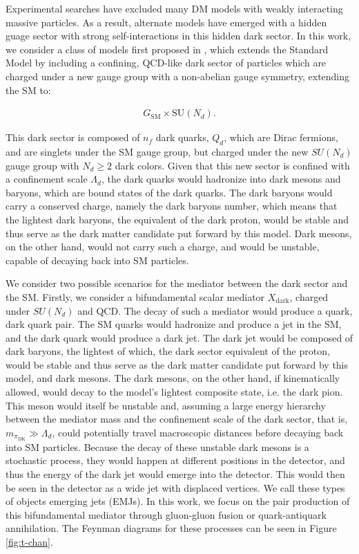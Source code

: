 Experimental searches have excluded many DM models with weakly interacting massive particles. As a result, alternate models have emerged with a hidden guage sector with strong self-interactions in this hidden dark sector. In this work, we consider a class of models first proposed in \cite{schwallerEmergingJets2015}, which extends the Standard Model by including a confining, QCD-like dark sector of particles which are charged under a new gauge group with a non-abelian gauge symmetry, extending the SM to:

\begin{equation}
	\begin{aligned}
		G_{\text{SM}} \times \text{SU}(N_d).
	\end{aligned}
\end{equation}

This dark sector is composed of $n_f$ dark quarks, $Q_d$, which are Dirac fermions, and are singlets under the SM gauge group, but charged under the new $SU(N_d)$ gauge group with $N_d \geq 2$ dark colors. Given that this new sector is confined with a confinement scale $\Lambda_d$, the dark quarks would hadronize into dark mesons and baryons, which are bound states of the dark quarks. The dark baryons would carry a conserved charge, namely the dark baryons number, which means that the lightest dark baryons, the equivalent of the dark proton, would be stable and thus serve as the dark matter candidate put forward by this model. Dark mesons, on the other hand, would not carry such a charge, and would be unstable, capable of decaying back into SM particles.

We consider two possible scenarios for the mediator between the dark sector and the SM. Firstly, we consider a bifundamental scalar mediator $X_{\text{dark}}$, charged under $SU(N_d)$ and QCD. The decay of such a mediator would produce a quark, dark quark pair. The SM quarks would hadronize and produce a jet in the SM, and the dark quark would produce a dark jet. The dark jet would be composed of dark baryons, the lightest of which, the dark sector equivalent of the proton, would be stable and thus serve as the dark matter candidate put forward by this model, and dark mesons. The dark mesons, on the other hand, if kinematically allowed, would decay to the model's lightest composite state, i.e. the dark pion. This meson would itself be unstable and, assuming a large energy hierarchy between the mediator mass and the confinement scale of the dark sector, that is, $m_{\pi_{\text{DK}}} \gg \Lambda_d$, could potentially travel macroscopic distances before decaying back into SM particles. Because the decay of these unstable dark mesons is a stochastic process, they would happen at different positions in the detector, and thus the energy of the dark jet would emerge into the detector. This would then be seen in the detector as a wide jet with displaced vertices. We call these types of objects emerging jets (EMJs). In this work, we focus on the pair production of this bifundamental mediator through gluon-gluon fusion or quark-antiquark annihilation. The Feynman diagrams for these processes can be seen in Figure \ref{fig:t-chan}.
\vspace{0.2in}

